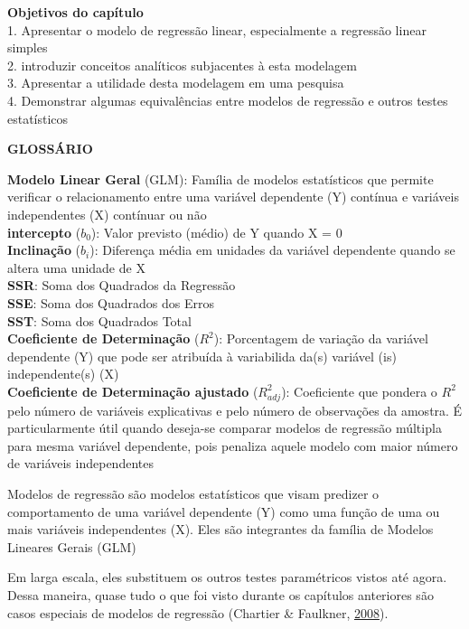 \documentclass[
]{book}
\begin{document}
\begin{objectives}
\textbf{Objetivos do capítulo}\\
1. Apresentar o modelo de regressão linear, especialmente a regressão
linear simples\\
2. introduzir conceitos analíticos subjacentes à esta modelagem\\
3. Apresentar a utilidade desta modelagem em uma pesquisa\\
4. Demonstrar algumas equivalências entre modelos de regressão e outros
testes estatísticos
\end{objectives}

\begin{writing}
\textbf{GLOSSÁRIO}

\textbf{Modelo Linear Geral} (GLM): Família de modelos estatísticos que
permite verificar o relacionamento entre uma variável dependente (Y)
contínua e variáveis independentes (X) contínuar ou não\\
\textbf{intercepto} (\(b_0\)): Valor previsto (médio) de Y quando X =
0\\
\textbf{Inclinação} (\(b_i\)): Diferença média em unidades da variável
dependente quando se altera uma unidade de X\\
\textbf{SSR}: Soma dos Quadrados da Regressão\\
\textbf{SSE}: Soma dos Quadrados dos Erros\\
\textbf{SST}: Soma dos Quadrados Total\\
\textbf{Coeficiente de Determinação} (\(R^2\)): Porcentagem de variação
da variável dependente (Y) que pode ser atribuída à variabilida da(s)
variável (is) independente(s) (X)\\
\textbf{Coeficiente de Determinação ajustado} (\(R^2_{adj}\)):
Coeficiente que pondera o \(R^2\) pelo número de variáveis explicativas
e pelo número de observações da amostra. É particularmente útil quando
deseja-se comparar modelos de regressão múltipla para mesma variável
dependente, pois penaliza aquele modelo com maior número de variáveis
independentes
\end{writing}

Modelos de regressão são modelos estatísticos que visam predizer o
comportamento de uma variável dependente (Y) como uma função de uma ou
mais variáveis independentes (X). Eles são integrantes da família de
Modelos Lineares Gerais (GLM)

Em larga escala, eles substituem os outros testes paramétricos vistos
até agora. Dessa maneira, quase tudo o que foi visto durante os
capítulos anteriores são casos especiais de modelos de regressão
(Chartier \& Faulkner, \protect\hyperlink{ref-Chartier2008}{2008}).
\end{document}
